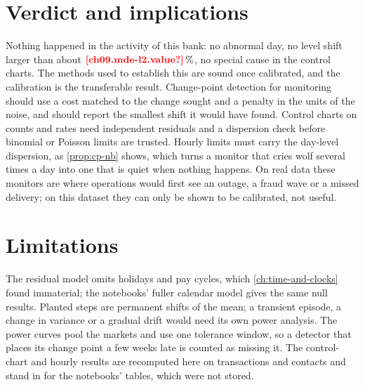 \section{Verdict and implications}\label{sec:cp-verdict}

Nothing happened in the activity of this bank: no abnormal day, no level shift larger than about $\est{ch09.mde-l2}{value}\,\%$, no
special cause in the control charts. The methods used to establish this are sound once calibrated, and the calibration
is the transferable result. Change-point detection for monitoring should use a cost matched to the change sought and a
penalty in the units of the noise, and should report the smallest shift it would have found. Control charts on counts
and rates need independent residuals and a dispersion check before binomial or Poisson limits are trusted. Hourly
limits must carry the day-level dispersion, as \cref{prop:cp-nb} shows, which turns a monitor that cries wolf several
times a day into one that is quiet when nothing happens. On real data these monitors are where operations would first see
an outage, a fraud wave or a missed delivery; on this dataset they can only be shown to be calibrated, not useful.

\section{Limitations}\label{sec:cp-limits}

The residual model omits holidays and pay cycles, which \cref{ch:time-and-clocks} found immaterial; the notebooks' fuller
calendar model gives the same null results. Planted steps are permanent shifts of the mean; a transient episode, a
change in variance or a gradual drift would need its own power analysis. The power curves pool the markets and use one
tolerance window, so a detector that places its change point a few weeks late is counted as missing it. The control-chart
and hourly results are recomputed here on transactions and contacts and stand in for the notebooks' tables, which were
not stored.
